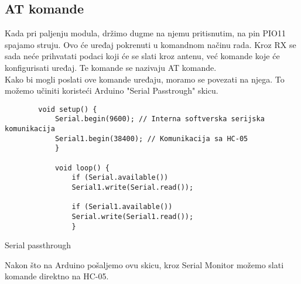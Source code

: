 \documentclass[../Document.tex]{subfiles}
\begin{document}
\subsection{AT komande} \label{hcat}
Kada pri paljenju modula, držimo dugme na njemu pritisnutim, na pin PIO11 spajamo struju. Ovo će uređaj pokrenuti u komandnom načinu rada. Kroz RX se sada neće prihvatati podaci koji će se slati kroz antenu, već komande koje će konfigurisati uređaj. Te komande se nazivaju AT komande.\\

Kako bi mogli poslati ove komande uređaju, moramo se povezati na njega. To možemo učiniti koristeći Arduino "Serial Passtrough" skicu.\\

\begin{code}
    \begin{verbatim}
        void setup() {
            Serial.begin(9600); // Interna softverska serijska komunikacija
            Serial1.begin(38400); // Komunikacija sa HC-05
            }
            
            void loop() {
                if (Serial.available())
                Serial1.write(Serial.read());
                
                if (Serial1.available())
                Serial.write(Serial1.read());
                }
            \end{verbatim}
    \caption{Serial passthrough}
\end{code}

Nakon što na Arduino pošaljemo ovu skicu, kroz Serial Monitor možemo slati komande direktno na HC-05.
\end{document}
